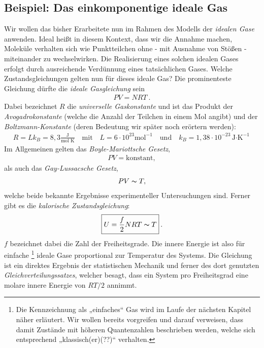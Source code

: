 \subsection{Beispiel: Das einkomponentige ideale Gas} 
Wir wollen das bisher Erarbeitete nun im Rahmen des Modells der \emph{idealen Gase} anwenden. Ideal heißt in diesem Kontext, dass wir die Annahme machen, Moleküle verhalten sich wie Punktteilchen ohne - mit Ausnahme von Stößen - miteinander zu wechselwirken. Die Realisierung eines solchen idealen Gases erfolgt durch ausreichende Verdünnung eines tatsächlichen Gases.
Welche Zustandsgleichungen gelten nun für dieses ideale Gas?
Die prominenteste Gleichung dürfte die \emph{ideale Gasgleichung} sein 
\begin{align*}
    \boxed{PV=NRT}\:.
\end{align*}
Dabei bezeichnet $R$ die \emph{universelle Gaskonstante} und ist das Produkt der \emph{Avogadrokonstante} (welche die Anzahl der Teilchen in einem Mol angibt) und der \emph{Boltzmann-Konstante} (deren Bedeutung wir später noch erörtern werden): 
\begin{align*}
    R=Lk_B=8,3\frac{\text{J}}{\text{mol K}}\quad\text{mit}\quad L=6\cdot10^{23}\text{mol}^{-1} \quad\text{und}\quad k_B=1,38\cdot10^{-23}\text{J$\cdot$K}^{-1}
\end{align*}
Im Allgemeinen gelten das \emph{Boyle-Mariottsche Gesetz},
\begin{align*}
    PV=\text{konstant},
\end{align*}
als auch das \emph{Gay-Lussacsche Gesetz}, 
\begin{align*}
    PV\thicksim T,
\end{align*}
welche beide bekannte Ergebnisse experimenteller Untersuchungen sind.
Ferner gibt es die \emph{kalorische Zustandsgleichung}: 
\begin{align*}
    \boxed{U=\frac{f}{2}NRT\thicksim T}\:.
\end{align*} 
$f$ bezeichnet dabei die Zahl der Freiheitsgrade. Die innere Energie ist also für einfache \footnote{Die Kennzeichnung als „einfaches“ Gas wird im Laufe der nächsten Kapitel näher erläutert. Wir wollen bereits vorgreifen und darauf verweisen, dass damit Zustände mit höheren Quantenzahlen beschrieben werden, welche sich entsprechend „klassisch(er)(??)“ verhalten.} ideale Gase proportional zur Temperatur des Systems. 
Die Gleichung ist ein direktes Ergebnis der statistischen Mechanik und ferner des dort genutzten \emph{Gleichverteilungssatzes}, welcher besagt, dass ein System pro Freiheitsgrad eine molare innere Energie von $RT/2$ annimmt.

